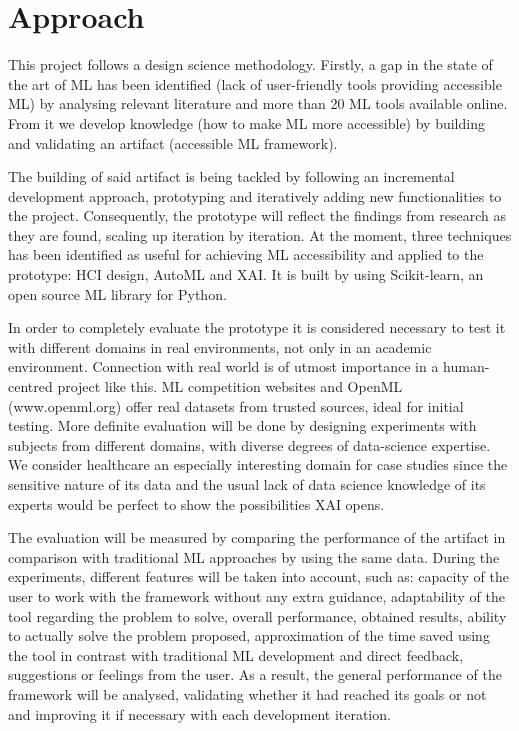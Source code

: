 \documentclass[runningheads]{llncs}
\begin{document}
\section{Approach}

This project follows a design science methodology. Firstly, a gap in the state of the art of ML has been identified (lack of user-friendly tools providing accessible ML) by analysing relevant literature and more than 20 ML tools available online. From it we develop knowledge (how to make ML more accessible) by building and validating an artifact (accessible ML framework).

The building of said artifact is being tackled by following an incremental development approach, prototyping and iteratively adding new functionalities to the project. Consequently, the prototype will reflect the findings from research as they are found, scaling up iteration by iteration. At the moment, three techniques has been identified as useful for achieving ML accessibility and applied to the prototype: HCI design, AutoML and XAI. It is built by using Scikit-learn, an open source ML library for Python.

In order to completely evaluate the prototype it is considered necessary to test it with different domains in real environments, not only in an academic environment. Connection with real world is of utmost importance in a human-centred project like this. ML competition websites and OpenML (www.openml.org) offer real datasets from trusted sources, ideal for initial testing. More definite evaluation will be done by designing experiments with subjects from different domains, with diverse degrees of data-science expertise. We consider healthcare an especially interesting domain for case studies since the sensitive nature of its data and the usual lack of data science knowledge of its experts would be perfect to show the possibilities XAI opens.

The evaluation will be measured by comparing the performance of the artifact in comparison with traditional ML approaches by using the same data.  During the experiments, different features will be taken into account, such as: capacity of the user to work with the framework without any extra guidance, adaptability of the tool regarding the problem to solve, overall performance, obtained results, ability to actually solve the problem proposed, approximation of the time saved using the tool in contrast with traditional ML development and direct feedback, suggestions or feelings from the user. As a result, the general performance of the framework will be analysed, validating whether it had reached its goals or not and improving it if necessary with each development iteration.
\end{document}
